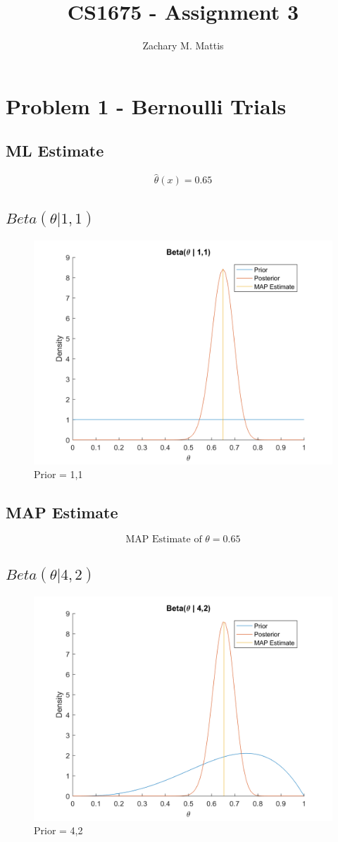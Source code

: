 \documentclass[12pt, letterpaper]{report}
\title{CS1675 - Assignment 3}
\author{Zachary M. Mattis}
\begin{document}
	
\maketitle

\section{Problem 1 - Bernoulli Trials}

\subsection{ML Estimate}

\[ \hat{\theta}(x) =  0.65 \]

\subsection{$Beta(\theta | 1,1)$}

\begin{figure}[H]
	\centering
	\includegraphics[width=0.7\columnwidth]{p1b.png}
	\caption{Prior = 1,1}
\end{figure}

\subsection{MAP Estimate}


\[ \textrm{MAP Estimate of } \theta = 0.65 \]


\subsection{$Beta(\theta | 4,2)$}

\begin{figure}[H]
	\centering
	\includegraphics[width=0.7\columnwidth]{p1d.png}
	\caption{Prior = 4,2}
\end{figure}
\end{document}
